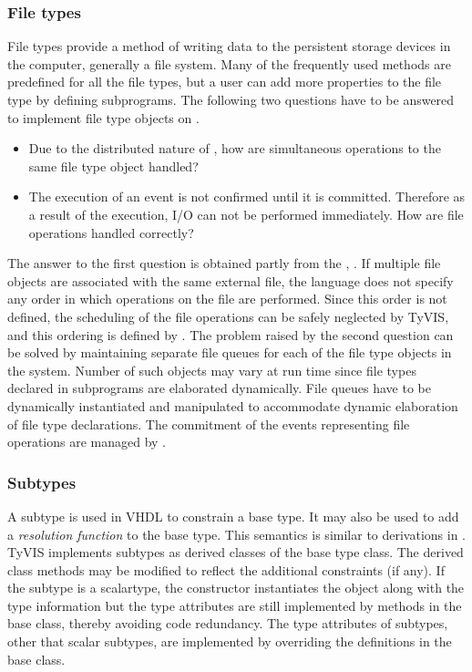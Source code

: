\documentclass[11pt]{article}
\begin{document}
\subsubsection{File types}
\label{sec:file_types}

File types provide a method of writing data to the persistent storage
devices in the computer, generally a file system.  Many of the frequently
used methods are predefined for all the file types, but a user can add
more properties to the file type by defining subprograms.  The following
two questions have to be answered to implement file type objects on
\warped.

\begin{itemize}
\item Due to the distributed nature of \warped, how are simultaneous
  operations to the same file type object handled?
\item The execution of an event is not confirmed until it is
  committed. Therefore as a result of the execution, I/O can not be
  performed immediately.  How are file operations handled correctly?
\end{itemize}

The answer to the first question is obtained partly from the \LRM,
.  If multiple file objects are associated with the same
external file, the language does not specify any order in which operations
on the file are performed.  Since this order is not defined, the scheduling
of the file operations can be safely neglected by TyVIS, and this ordering
is defined by \warped.  The problem raised by the second question can be
solved by maintaining separate file queues for each of the file type
objects in the system.  Number of such objects may vary at run time since
file types declared in subprograms are elaborated dynamically.  File queues
have to be dynamically instantiated and manipulated to accommodate dynamic
elaboration of file type declarations.  The commitment of the events
representing file operations are managed by \warped.

\subsubsection{Subtypes}

A subtype is used in VHDL to constrain a base type.  It may also be
used to add a \textit{resolution function} to the base type.  This
semantics is similar to derivations in \Cpp\/.  TyVIS implements
subtypes as derived classes of the base type class.  The derived class
methods may be modified to reflect the additional constraints (if
any).  If the subtype is a scalartype, the constructor instantiates the 
object along with the type information but the type attributes are still 
implemented by methods in the base class, thereby avoiding code redundancy.  
The type attributes of subtypes, other that scalar subtypes, 
are implemented by overriding the definitions in the base class.
\end{document}
